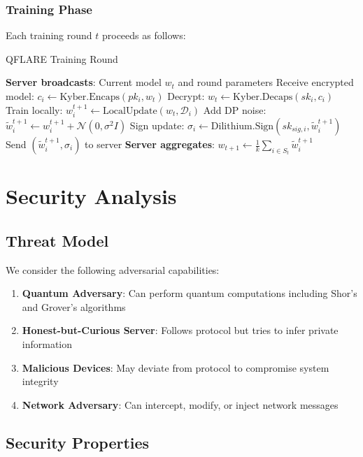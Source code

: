 \documentclass[journal]{IEEEtran}
\begin{document}
\subsubsection{Training Phase}
Each training round $t$ proceeds as follows:

\begin{algorithm}
\caption{QFLARE Training Round}
\begin{algorithmic}[1]
\STATE \textbf{Server broadcasts}: Current model $w_t$ and round parameters
    \STATE Receive encrypted model: $c_i \leftarrow \text{Kyber.Encaps}(pk_i, w_t)$
    \STATE Decrypt: $w_t \leftarrow \text{Kyber.Decaps}(sk_i, c_i)$
    \STATE Train locally: $w_i^{t+1} \leftarrow \text{LocalUpdate}(w_t, \mathcal{D}_i)$
    \STATE Add DP noise: $\tilde{w}_i^{t+1} \leftarrow w_i^{t+1} + \mathcal{N}(0, \sigma^2 I)$
    \STATE Sign update: $\sigma_i \leftarrow \text{Dilithium.Sign}(sk_{sig,i}, \tilde{w}_i^{t+1})$
    \STATE Send $(\tilde{w}_i^{t+1}, \sigma_i)$ to server
\ENDFOR
\STATE \textbf{Server aggregates}: $w_{t+1} \leftarrow \frac{1}{k} \sum_{i \in S_t} \tilde{w}_i^{t+1}$
\end{algorithmic}
\end{algorithm}

\section{Security Analysis}

\subsection{Threat Model}

We consider the following adversarial capabilities:

\begin{enumerate}
\item \textbf{Quantum Adversary}: Can perform quantum computations including Shor's and Grover's algorithms
\item \textbf{Honest-but-Curious Server}: Follows protocol but tries to infer private information
\item \textbf{Malicious Devices}: May deviate from protocol to compromise system integrity
\item \textbf{Network Adversary}: Can intercept, modify, or inject network messages
\end{enumerate}

\subsection{Security Properties}
\end{document}

